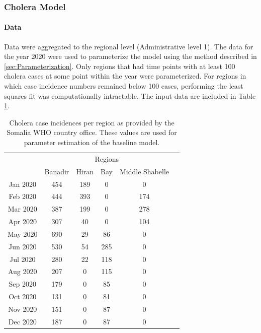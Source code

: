 \documentclass[letter,12pt, usenames,dvipsnames]{article}
\begin{document}
\subsubsection{Cholera Model}
\paragraph{Data}
Data were aggregated to the regional level (Administrative level 1).  The data for the year 2020 were used to parameterize the model using the method described in \ref{sec:Parameterization}.  Only regions that had time points with at least 100 cholera cases at some point within the year were parameterized.  For regions in which case incidence numbers remained below 100 cases, performing the least squares fit was computationally intractable.  The input data are included in Table \ref{table:choleraData}.
 
\begin{table}[h!]
    \centering
    {\footnotesize
    \begin{tabular}{|c||c|c| c| c | c|}
        \hline
         &\multicolumn{4}{c|}{Regions}\\\cline{2-5}
         & Banadir & Hiran & Bay & Middle Shabelle\\\hline\hline	 
         
         Jan 2020 &454&	189&	0&	0	\\\hline	 
         
         
        Feb 2020 & 444	&	393	&0&	174	\\\hline	 
         
        
        Mar 2020 & 	387&	199&	0&	278\\\hline
        
        Apr 2020 &	307&	40&	0&	104\\\hline
        
        May 2020 & 	690&	29&	86&	0\\\hline
        
        Jun 2020 & 	530&	54&	285&	0\\\hline
        
        Jul 2020 &	280&	22&	118&	0\\\hline
        
        Aug 2020 & 	207&	0&	115&	0\\\hline
        
        Sep 2020 &	179&	0&	85&	0\\\hline
        
        Oct 2020 & 	131&	0&	81&	0\\\hline
        
        Nov 2020 & 	151&	0&	87&	0\\\hline
        
        Dec 2020 & 	187&	0&	87&	0\\\hline
         
    \end{tabular}
    }
    \caption{Cholera case incidences per region as provided by the Somalia WHO country office.  These values are used for parameter estimation of the baseline model.}
    \label{table:choleraData}
\end{table}
\end{document}
